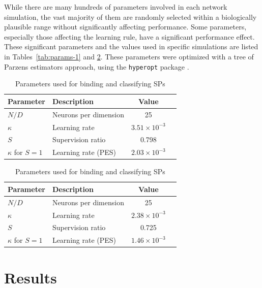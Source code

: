 \documentclass[10pt,letterpaper]{article}
\begin{document}
While there are many hundreds of parameters
involved in each network simulation,
the vast majority of them are randomly selected
within a biologically plausible range
without significantly affecting performance.
Some parameters, especially those affecting
the learning rule, have a significant performance effect.
These significant parameters and the values
used in specific simulations are listed
in Tables~\ref{tab:params-1} and \ref{tab:params-2}.
These parameters were optimized
with a tree of Parzens estimators approach,
using the \texttt{hyperopt} package \cite{Bergstra2013}.

\begin{table}[!ht]
\begin{center} 
\caption{Parameters used for transmitting semantic pointers}
\vspace{0.2ex}
\label{tab:params-1} 
\begin{tabular}{llcc} 
\hline
Parameter & Description & Value \\
\hline
$N / D$ & Neurons per dimension & 25 \\
$\kappa$ & Learning rate & $3.51 \times 10^{-3}$ \\
$S$ & Supervision ratio & 0.798 \\
$\kappa$ for $S = 1$ & Learning rate (PES) & $2.03 \times 10^{-3}$\\ 
\hline
\end{tabular} 
\end{center}
\begin{center} 
\caption{Parameters used for binding and classifying SPs}
\vspace{0.2ex}
\label{tab:params-2} 
\begin{tabular}{llcc} 
\hline
Parameter & Description & Value \\
\hline
$N / D$ & Neurons per dimension & 25 \\
$\kappa$ & Learning rate & $2.38 \times 10^{-3}$ \\
$S$ & Supervision ratio & 0.725 \\
$\kappa$ for $S = 1$ & Learning rate (PES) & $1.46 \times 10^{-3}$ \\ 
\hline
\end{tabular} 
\end{center}
\end{table}

\section{Results}
\end{document}
